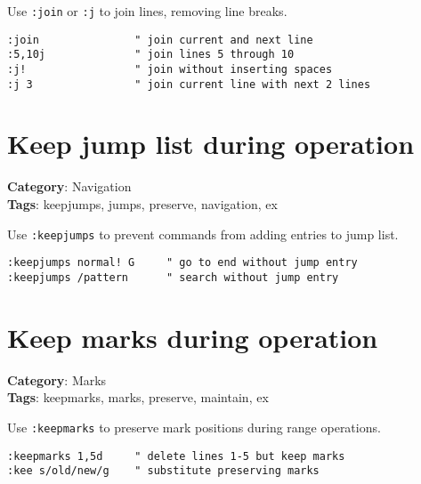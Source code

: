 {{{{Use {\footnotesize \Verb§:join§} or {\footnotesize \Verb§:j§} to join lines, removing line breaks.

\begin{Exa*}{}
\begin{Verbatim}[fontsize=\footnotesize, breaklines, breakanywhere]
:join               " join current and next line
:5,10j              " join lines 5 through 10
:j!                 " join without inserting spaces
:j 3                " join current line with next 2 lines
\end{Verbatim}
\end{Exa*}

\section{Keep jump list during operation}

\textbf{Category}: Navigation\\ \textbf{Tags}: keepjumps, jumps, preserve, navigation, ex
\vspace{0.5cm}

Use {\footnotesize \Verb§:keepjumps§} to prevent commands from adding entries to jump list.

\begin{Exa*}{}
\begin{Verbatim}[fontsize=\footnotesize, breaklines, breakanywhere]
:keepjumps normal! G     " go to end without jump entry
:keepjumps /pattern      " search without jump entry
\end{Verbatim}
\end{Exa*}

\section{Keep marks during operation}

\textbf{Category}: Marks\\ \textbf{Tags}: keepmarks, marks, preserve, maintain, ex
\vspace{0.5cm}

Use {\footnotesize \Verb§:keepmarks§} to preserve mark positions during range operations.

\begin{Exa*}{}
\begin{Verbatim}[fontsize=\footnotesize, breaklines, breakanywhere]
:keepmarks 1,5d     " delete lines 1-5 but keep marks
:kee s/old/new/g    " substitute preserving marks
\end{Verbatim}
\end{Exa*}

}}}}
